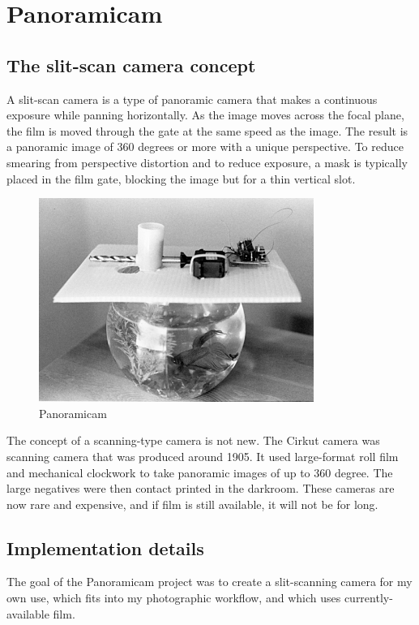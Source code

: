\documentclass[dvips,12pt]{article}
\begin{document}
\section{Panoramicam}

\subsection{The slit-scan camera concept}
A slit-scan camera is a type of panoramic camera that makes a continuous exposure while panning horizontally. As the image moves across the focal plane, the film is moved through the gate at the same speed as the image. The result is a panoramic image of 360 degrees or more with a unique perspective. To reduce smearing from perspective distortion and to reduce exposure, a mask is typically placed in the film gate, blocking the image but for a thin vertical slot.

\begin{figure}
\centering
\includegraphics[width=0.8\textwidth]{test}
\caption{Panoramicam}
\label{fig:Panoramicam}
\end{figure}

The concept of a scanning-type camera is not new. The Cirkut camera was scanning camera that was produced around 1905. It used large-format roll film and mechanical clockwork to take panoramic images of up to 360 degree. The large negatives were then contact printed in the darkroom. These cameras are now rare and expensive, and if film is still available, it will not be for long.

\subsection{Implementation details}

The goal of the Panoramicam project was to create a slit-scanning camera for my own use, which fits into my photographic workflow, and which uses currently-available film.
\end{document}
